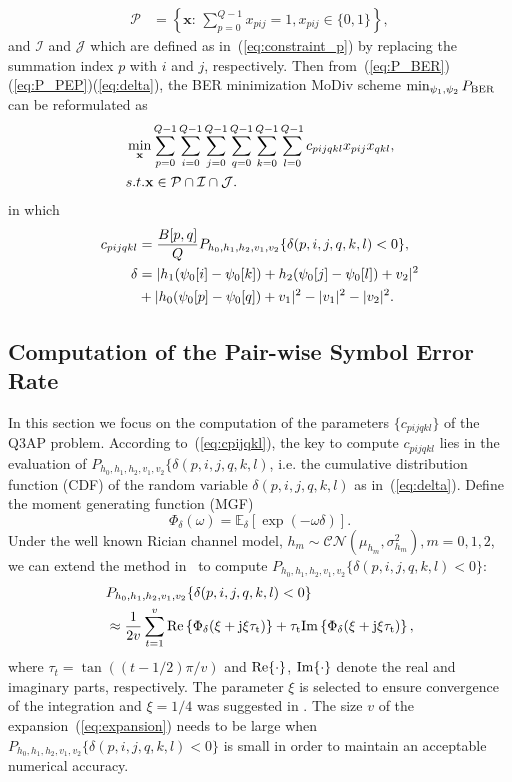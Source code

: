 \documentclass[journal]{IEEEtran}
\newcommand{\BER}{\rm{BER}}
\renewcommand{\Re}{\rm Re}
\renewcommand{\Im}{\rm Im}
\begin{document}
\begin{align}
    \mathcal{P} & = \left\{\mathbf{x}:\,\sum_{p=0}^{Q-1}x_{pij} = 1,
    x_{pij}\in\{0, 1\}\right\}, \label{eq:constraint_p}
\end{align}
and $\mathcal{I}$ and $\mathcal{J}$ which are defined as
in~(\ref{eq:constraint_p}) by replacing the summation index $p$ with $i$ and
$j$, respectively. Then from~(\ref{eq:P_BER})(\ref{eq:P_PEP})(\ref{eq:delta}),
the BER minimization MoDiv scheme $\min_{\psi_1, \psi_2}P_{\BER}$ can be
reformulated as
\begin{align}
    & \min_{\mathbf{x}}\sum_{p=0}^{Q-1}\sum_{i=0}^{Q-1}\sum_{j=0}^{Q-1}
    \sum_{q=0}^{Q-1}\sum_{k=0}^{Q-1}\sum_{l=0}^{Q-1}c_{pijqkl}x_{pij}x_{qkl},
    \label{eq:Q3AP}\\
    & \mbox{s.t. } \mathbf{x}\in \mathcal{P}\cap\mathcal{I}\cap\mathcal{J}.
    \notag
\end{align}
in which
\begin{align}
    c_{pijqkl} & = \frac{B[p, q]}{Q}P_{h_0,h_1,h_2,v_1,v_2}\{\delta(p,i,j,q,k,l)
    < 0\},
    \label{eq:cpijqkl} \\
    \delta & = |h_1(\psi_0[i] - \psi_0[k])+h_2(\psi_0[j] - \psi_0[l])+v_2|^2 
 \notag
    \\
    &
       + |h_0(\psi_0[p] - \psi_0[q]) + v_1|^2 - |v_1|^2 -
    |v_2|^2.\label{eq:delta_pijqkl}
\end{align}

\subsection{Computation of the Pair-wise Symbol Error Rate}

In this section we focus on the computation of the parameters $\{c_{pijqkl}\}$
of the Q3AP problem. According to~(\ref{eq:cpijqkl}), the key to compute
$c_{pijqkl}$ lies in the evaluation of
$P_{h_0,h_1,h_2,v_1,v_2}\{\delta(p,i,j,q,k,l)$, i.e. the cumulative distribution
function (CDF) of the random variable $\delta(p,i,j,q,k,l)$ as
in~(\ref{eq:delta}). Define the moment generating function (MGF)
\[\Phi_{\delta}(\omega) = \mathbb{E}_{\delta}[\exp(-\omega\delta)].\]
Under the well known Rician channel model, 
$h_m\sim\mathcal{CN}(\mu_{h_m},\sigma_{h_m}^2), m=0,1,2$, we 
can extend the method
in~\cite{harvind2005symbol, taricco2002exact} to compute
$P_{h_0,h_1,h_2,v_1,v_2}\{\delta(p,i,j,q,k,l) < 0\}$:
\begin{align}
    & P_{h_0,h_1,h_2,v_1,v_2}\{\delta(p,i,j,q,k,l) < 0\} \notag \\
    & \approx \frac{1}{2v}\sum_{t=1}^v \Re\left\{\Phi_{\delta}(\xi +
    j\xi\tau_t)\right\} + \tau_t\Im\left\{\Phi_{\delta}(\xi +
    j\xi\tau_t)\right\},
    \label{eq:expansion}
\end{align}
where $\tau_t = \tan((t- 1/2)\pi/v)$
and $\Re\{\cdot\}$, $\Im\{\cdot\}$ denote the real and imaginary parts,
respectively. 
The parameter $\xi$ is selected to ensure convergence of the
integration and $\xi = 1/4$ was suggested in \cite{taricco2002exact}. The
size $v$ of the expansion~(\ref{eq:expansion}) needs to be large when $
P_{h_0,h_1,h_2,v_1,v_2}\{\delta(p,i,j,q,k,l) < 0\}$ is small in order to
maintain an acceptable numerical accuracy.
\end{document}
